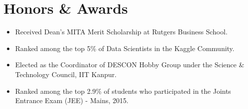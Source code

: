 \documentclass[letterpaper,11pt]{article}
\newcommand{\resumeItem}[1]{
  \item\small{
    {#1 \vspace{-2pt}}
  }
}
\newcommand{\resumeItemListStart}{\begin{itemize}}
\newcommand{\resumeItemListEnd}{\end{itemize}\vspace{-5pt}}
\begin{document}
\section{Honors \& Awards}
            \resumeItemListStart
                \resumeItem{Received Dean’s MITA Merit Scholarship at Rutgers Business School.}
                \vspace{-2.0mm}
                \resumeItem{Ranked among the top 5\% of Data Scientists in the Kaggle Community.}
                \vspace{-2.0mm}
                \resumeItem{Elected as the Coordinator of DESCON Hobby Group under the Science \& Technology Council, IIT Kanpur.}
                \vspace{-2.0mm}
                \resumeItem{Ranked among the top 2.9\% of students who participated in the Joints Entrance Exam (JEE) - Mains, 2015.}
            \resumeItemListEnd
\end{document}
